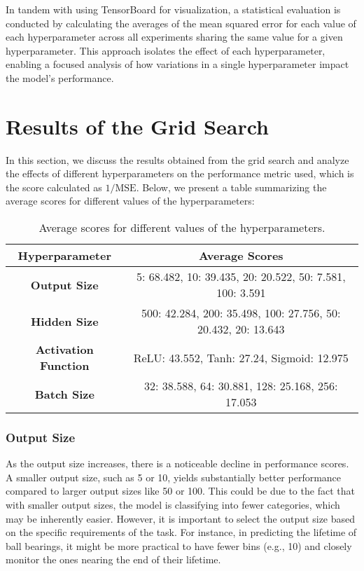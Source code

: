 In tandem with using TensorBoard for visualization, a statistical evaluation is conducted by calculating the averages of the mean squared error for each value of each hyperparameter across all experiments sharing the same value for a given hyperparameter. This approach isolates the effect of each hyperparameter, enabling a focused analysis of how variations in a single hyperparameter impact the model's performance.


\section{Results of the Grid Search}

In this section, we discuss the results obtained from the grid search and analyze the effects of different hyperparameters on the performance metric used, which is the score calculated as \(1/\text{MSE}\). Below, we present a table summarizing the average scores for different values of the hyperparameters:

\begin{table}[h]
\centering
\begin{tabular}{|c|c|}
\hline
\textbf{Hyperparameter} & \textbf{Average Scores} \\
\hline
\textbf{Output Size} & 5: 68.482, 10: 39.435, 20: 20.522, 50: 7.581, 100: 3.591 \\
\hline
\textbf{Hidden Size} & 500: 42.284, 200: 35.498, 100: 27.756, 50: 20.432, 20: 13.643 \\
\hline
\textbf{Activation Function} & ReLU: 43.552, Tanh: 27.24, Sigmoid: 12.975 \\
\hline
\textbf{Batch Size} & 32: 38.588, 64: 30.881, 128: 25.168, 256: 17.053 \\
\hline
\end{tabular}
\caption{Average scores for different values of the hyperparameters.}
\end{table}

\subsubsection{Output Size}

As the output size increases, there is a noticeable decline in performance scores. A smaller output size, such as 5 or 10, yields substantially better performance compared to larger output sizes like 50 or 100. This could be due to the fact that with smaller output sizes, the model is classifying into fewer categories, which may be inherently easier. However, it is important to select the output size based on the specific requirements of the task. For instance, in predicting the lifetime of ball bearings, it might be more practical to have fewer bins (e.g., 10) and closely monitor the ones nearing the end of their lifetime.

